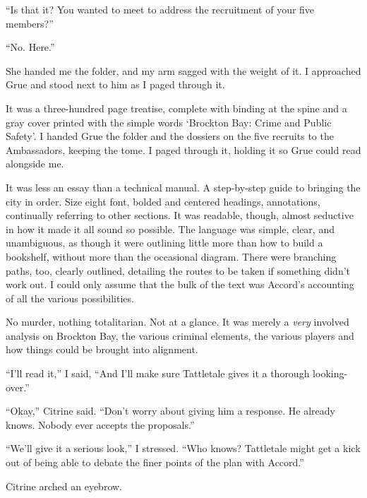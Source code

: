 ``Is that it?  You wanted to meet to address the recruitment of your five members?''



``No.  Here.''



She handed me the folder, and my arm sagged with the weight of it.  I approached Grue and stood next to him as I paged through it.



It was a three-hundred page treatise, complete with binding at the spine and a gray cover printed with the simple words `Brockton Bay: Crime and Public Safety'.  I handed Grue the folder and the dossiers on the five recruits to the Ambassadors, keeping the tome.  I paged through it, holding it so Grue could read alongside me.



It was less an essay than a technical manual.  A step-by-step guide to bringing the city in order.  Size eight font, bolded and centered headings, annotations, continually referring to other sections.  It was readable, though, almost seductive in how it made it all sound so possible.  The language was simple, clear, and unambiguous, as though it were outlining little more than how to build a bookshelf, without more than the occasional diagram.  There were branching paths, too, clearly outlined, detailing the routes to be taken if something didn't work out.  I could only assume that the bulk of the text was Accord's accounting of all the various possibilities.



No murder, nothing totalitarian.  Not at a glance.  It was merely a \emph{very} involved analysis on Brockton Bay, the various criminal elements, the various players and how things could be brought into alignment.



``I'll read it,'' I said, ``And I'll make sure Tattletale gives it a thorough looking-over.''



``Okay,'' Citrine said.  ``Don't worry about giving him a response.  He already knows.  Nobody ever accepts the proposals.''



``We'll give it a serious look,'' I stressed.  ``Who knows?  Tattletale might get a kick out of being able to debate the finer points of the plan with Accord.''



Citrine arched an eyebrow.



